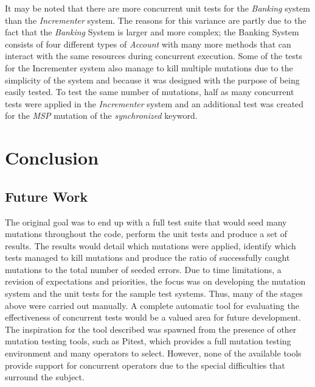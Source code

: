 \documentclass[a4paper,12pt]{article}
\begin{document}
It may be noted that there are more concurrent unit tests for the \textit{Banking} system than the \textit{Incrementer} system. The reasons for this variance are partly due to the fact that the \textit{Banking} System is larger and more complex; the Banking System consists of four different types of \textit{Account} with many more methods that can interact with the same resources during concurrent execution. Some of the tests for the Incrementer system also manage to kill multiple mutations due to the simplicity of the system and because it was designed with the purpose of being easily tested. To test the same number of mutations, half as many concurrent tests were applied in the \textit{Incrementer} system and an additional test was created for the \textit{MSP} mutation of the \textit{synchronized} keyword.   

    
    
\newpage	
\section{Conclusion}

\subsection{Future Work}
The original goal was to end up with a full test suite that would seed many mutations throughout the code, perform the unit tests and produce a set of results. The results would detail which mutations were applied, identify which tests managed to kill mutations and produce the ratio of successfully caught mutations to the total number of seeded errors. Due to time limitations, a revision of expectations and priorities, the focus was on developing the mutation system and the unit tests for the sample test systems. Thus, many of the stages above were carried out manually. A complete automatic tool for evaluating the effectiveness of concurrent tests would be a valued area for future development. The inspiration for the tool described was spawned from the presence of other mutation testing tools, such as Pitest, which provides a full mutation testing environment and many operators to select. However, none of the available tools provide support for concurrent operators due to the special difficulties that surround the subject.
\end{document}
